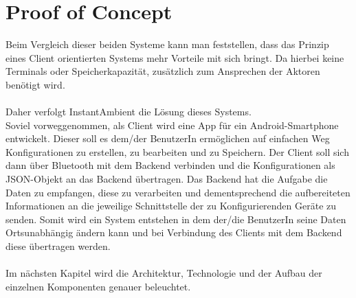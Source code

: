 \section{Proof of Concept}
Beim Vergleich dieser beiden Systeme kann man feststellen, dass das Prinzip eines Client orientierten Systems mehr Vorteile mit sich bringt. Da hierbei keine Terminals oder Speicherkapazität, zusätzlich zum Ansprechen der Aktoren benötigt wird. 
\\\\ 
Daher verfolgt InstantAmbient die Lösung dieses Systems. \\
Soviel vorweggenommen, als Client wird eine App für ein Android-Smartphone entwickelt. Dieser soll es dem/der BenutzerIn ermöglichen auf einfachen Weg Konfigurationen zu erstellen, zu bearbeiten und zu Speichern. Der Client soll sich dann über Bluetooth mit dem Backend verbinden und die Konfigurationen als JSON-Objekt an das Backend übertragen. Das Backend hat die Aufgabe die Daten zu empfangen, diese zu verarbeiten und dementsprechend die aufbereiteten Informationen an die jeweilige Schnittstelle der zu Konfigurierenden Geräte zu senden. 
Somit wird ein System entstehen in dem der/die BenutzerIn seine Daten Ortsunabhängig ändern kann und bei Verbindung des Clients mit dem Backend diese übertragen werden. 
\\\\
Im nächsten Kapitel wird die Architektur, Technologie und der Aufbau der einzelnen Komponenten genauer beleuchtet.

